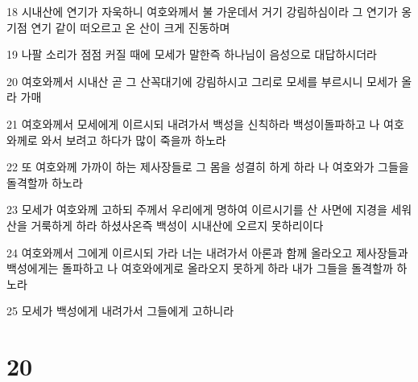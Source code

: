 \par 18 시내산에 연기가 자욱하니 여호와께서 불 가운데서 거기 강림하심이라 그 연기가 옹기점 연기 같이 떠오르고 온 산이 크게 진동하며
\par 19 나팔 소리가 점점 커질 때에 모세가 말한즉 하나님이 음성으로 대답하시더라
\par 20 여호와께서 시내산 곧 그 산꼭대기에 강림하시고 그리로 모세를 부르시니 모세가 올라 가매
\par 21 여호와께서 모세에게 이르시되 내려가서 백성을 신칙하라 백성이돌파하고 나 여호와께로 와서 보려고 하다가 많이 죽을까 하노라
\par 22 또 여호와께 가까이 하는 제사장들로 그 몸을 성결히 하게 하라 나 여호와가 그들을 돌격할까 하노라
\par 23 모세가 여호와께 고하되 주께서 우리에게 명하여 이르시기를 산 사면에 지경을 세워 산을 거룩하게 하라 하셨사온즉 백성이 시내산에 오르지 못하리이다
\par 24 여호와께서 그에게 이르시되 가라 너는 내려가서 아론과 함께 올라오고 제사장들과 백성에게는 돌파하고 나 여호와에게로 올라오지 못하게 하라 내가 그들을 돌격할까 하노라
\par 25 모세가 백성에게 내려가서 그들에게 고하니라

\chapter{20}

